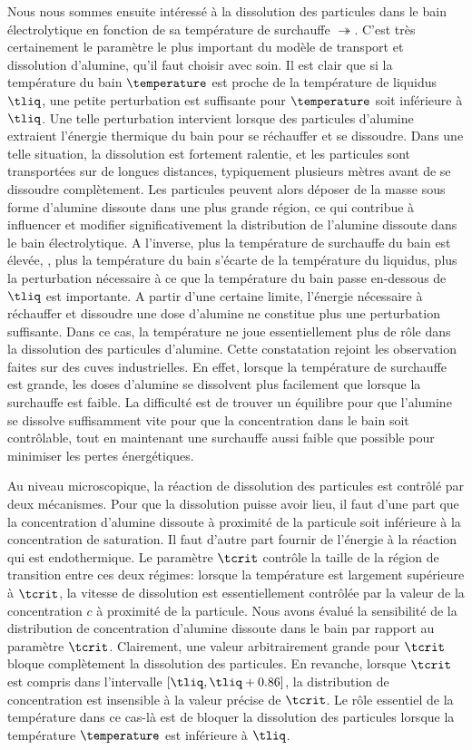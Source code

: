 Nous nous sommes ensuite intéressé à la dissolution des particules
dans le bain électrolytique en fonction de sa température de
surchauffe $\tsur$. C'est très certainement le paramètre le plus
important du modèle de transport et dissolution d'alumine, qu'il faut
choisir avec soin. Il est clair que si la température du bain
$\temperature$ est proche de la température de liquidus $\tliq$, une
petite perturbation est suffisante pour $\temperature$ soit inférieure
à $\tliq$. Une telle perturbation intervient lorsque des particules
d'alumine extraient l'énergie thermique du bain pour se réchauffer et
se dissoudre. Dans une telle situation, la dissolution est fortement
ralentie, et les particules sont transportées sur de longues distances,
typiquement plusieurs mètres avant de se dissoudre complètement. Les
particules peuvent alors déposer de la masse sous forme d'alumine
dissoute dans une plus grande région, ce qui contribue à influencer et
modifier significativement la distribution de l'alumine dissoute dans
le bain électrolytique. A l'inverse, plus la température de surchauffe
du bain est élevée, \ie, plus la température du bain s'écarte de la
température du liquidus, plus la perturbation nécessaire à ce que la
température du bain passe en-dessous de $\tliq$ est importante. A
partir d'une certaine limite, l'énergie nécessaire à réchauffer et
dissoudre une dose d'alumine ne constitue plus une perturbation
suffisante. Dans ce cas, la température ne joue essentiellement plus
de rôle dans la dissolution des particules d'alumine. Cette
constatation rejoint les observation faites sur des cuves
industrielles. En effet, lorsque la température de surchauffe est
grande, les doses d'alumine se dissolvent plus facilement que lorsque
la surchauffe est faible. La difficulté est de trouver un équilibre
pour que l'alumine se dissolve suffisamment vite pour que la
concentration dans le bain soit contrôlable, tout en maintenant une
surchauffe aussi faible que possible pour minimiser les pertes
énergétiques.

Au niveau microscopique, la réaction de dissolution des particules est
contrôlé par deux mécanismes. Pour que la dissolution puisse avoir
lieu, il faut d'une part que la concentration d'alumine dissoute à
proximité de la particule soit inférieure à la concentration de
saturation. Il faut d'autre part fournir de l'énergie à la réaction
qui est endothermique. Le paramètre $\tcrit$ contrôle la taille de la
région de transition entre ces deux régimes: lorsque la température
est largement supérieure à $\tcrit$, la vitesse de dissolution est
essentiellement contrôlée par la valeur de la concentration $c$ à
proximité de la particule. Nous avons évalué la sensibilité de la
distribution de concentration d'alumine dissoute dans le bain par
rapport au paramètre $\tcrit$. Clairement, une valeur arbitrairement
grande pour $\tcrit$ bloque complètement la dissolution des
particules. En revanche, lorsque $\tcrit$ est compris dans
l'intervalle $[\tliq, \tliq + 0.86]$, la distribution de concentration
est insensible à la valeur précise de $\tcrit$. Le rôle essentiel de
la température dans ce cas-là est de bloquer la dissolution des
particules lorsque la température $\temperature$ est inférieure à
$\tliq$.

